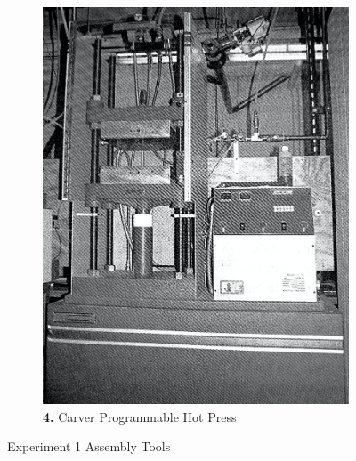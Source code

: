 \begin{figure}[!h]
\begin{subfigure}[t]{.4\textwidth}
    \includegraphics[width=\linewidth]{Pictures/Apparatus/Experiment 1/eight.png}
    \caption{\textbf{4.} Carver Programmable Hot Press}
  \end{subfigure}
  \caption{Experiment 1 Assembly Tools}
  \label{fig:exp1}
\end{figure}

\clearpage

